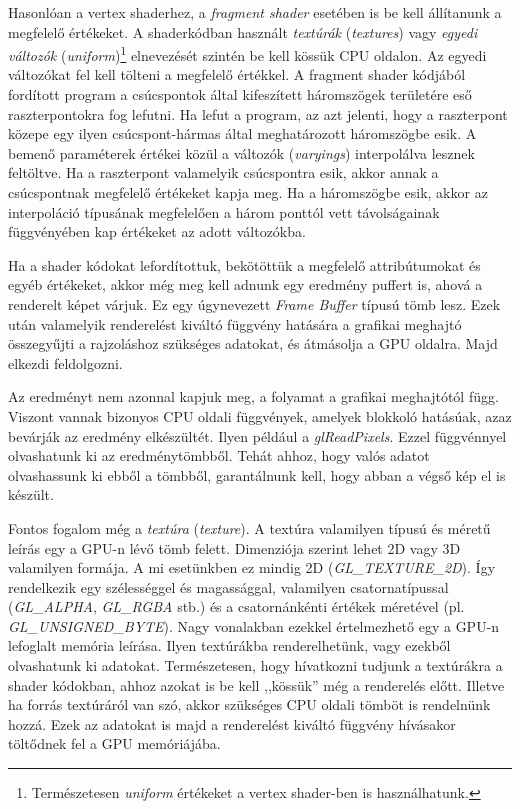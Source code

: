 \documentclass[12pt]{report}
\theoremstyle{definition}
\newcommand{\inenglish}[1]{\textsl{#1}}
\newcommand{\func}[1]{{\textsl{#1}}}
\begin{document}
Hasonlóan a vertex shaderhez, a \emph{fragment shader} esetében is be kell
állítanunk a megfelelő értékeket. A shaderkódban használt \emph{textúrák}
(\inenglish{textures}) vagy \emph{egyedi változók}
(\inenglish{uniform})\footnote{Természetesen \func{uniform} értékeket a vertex
shader-ben is használhatunk.} elnevezését szintén be kell kössük CPU oldalon.
Az egyedi változókat fel kell tölteni a megfelelő értékkel. A fragment shader
kódjából fordított program a csúcspontok által kifeszített háromszögek
területére eső raszterpontokra fog lefutni. Ha lefut a program, az azt jelenti,
hogy a raszterpont közepe egy ilyen csúcspont-hármas által meghatározott
háromszögbe esik. A bemenő paraméterek értékei közül a változók
(\inenglish{varyings}) interpolálva lesznek feltöltve. Ha a raszterpont
valamelyik csúcspontra esik, akkor annak a csúcspontnak megfelelő értékeket
kapja meg. Ha a háromszögbe esik, akkor az interpoláció típusának megfelelően a
három ponttól vett távolságainak függvényében kap értékeket az adott
változókba.

Ha a shader kódokat lefordítottuk, bekötöttük a megfelelő attribútumokat és
egyéb értékeket, akkor még meg kell adnunk egy eredmény puffert is, ahová a
renderelt képet várjuk. Ez egy úgynevezett \func{Frame Buffer} típusú tömb
lesz. Ezek után valamelyik renderelést kiváltó függvény hatására a grafikai
meghajtó összegyűjti a rajzoláshoz szükséges adatokat, és átmásolja a GPU
oldalra. Majd elkezdi feldolgozni.

Az eredményt nem azonnal kapjuk meg, a folyamat a grafikai meghajtótól függ.
Viszont vannak bizonyos CPU oldali függvények, amelyek blokkoló hatásúak, azaz
bevárják az eredmény elkészültét. Ilyen például a \func{glReadPixels}. Ezzel
függvénnyel olvashatunk ki az eredménytömbből. Tehát ahhoz, hogy valós adatot
olvashassunk ki ebből a tömbből, garantálnunk kell, hogy abban a végső kép el
is készült.

Fontos fogalom még a \emph{textúra} (\inenglish{texture}). A textúra valamilyen
típusú és méretű leírás egy a GPU-n lévő tömb felett. Dimenziója szerint lehet
2D vagy 3D valamilyen formája. A mi esetünkben ez mindig 2D
(\func{GL\_TEXTURE\_2D}). Így rendelkezik egy szélességgel és magassággal,
valamilyen csatornatípussal (\func{GL\_ALPHA}, \func{GL\_RGBA} stb.) és a
csatornánkénti értékek méretével (pl. \func{GL\_UNSIGNED\_BYTE}). Nagy
vonalakban ezekkel értelmezhető egy a GPU-n lefoglalt memória leírása. Ilyen
textúrákba renderelhetünk, vagy ezekből olvashatunk ki adatokat. Természetesen,
hogy hívatkozni tudjunk a textúrákra a shader kódokban, ahhoz azokat is be kell
,,kössük'' még a renderelés előtt. Illetve ha forrás textúráról van szó, akkor
szükséges CPU oldali tömböt is rendelnünk hozzá. Ezek az adatokat is majd a
renderelést kiváltó függvény hívásakor töltődnek fel a GPU memóriájába.
\end{document}
